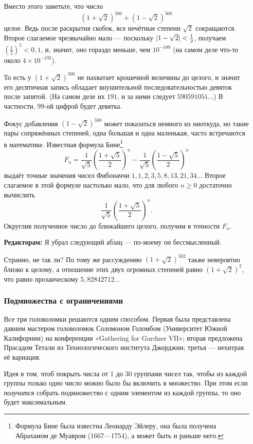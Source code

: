Вместо этого заметьте, что число
\[(1+\sqrt{2})^{500}+(1-\sqrt{2})^{500}\]
целое.
Ведь после раскрытия скобок, все нечётные степени $\sqrt{2}$ сокращаются.
Второе слагаемое чрезвычайно мало --- поскольку $|1-\sqrt{2}|\z<\tfrac12$, получаем $(\tfrac12)^5<0{,}1$, и, значит, оно гораздо меньше, чем $10^{-100}$ (на самом деле что-то около $4 \times 10^{-192}$).

То есть у $(1+\sqrt{2})^{500}$ не нахватает крошечной величины до целого, и значит его десятичная запись обладает внушительной последовательностью девяток после запятой.
(На самом деле их $191$, и за ними следует $590591051\dots$)
В частности, 99-ой цифрой будет девятка.

Фокус добавления $(1-\sqrt{2})^{500}$ может показаться немного из ниоткуда, но такие пары сопряжённых степеней, одна большая и одна маленькая, часто встречаются в математике.
Известная формула Бине\footnote{Формула Бине была известна Леонарду Эйлеру, она была получена Абрахамом де Муавром (1667---1754), а может быть и раньше него.}
\[F_n=\frac{1}{\sqrt{5}}\left(\frac{1+\sqrt{5}}2\right)^n-\frac{1}{\sqrt{5}}\left(\frac{1-\sqrt{5}}2\right)^n\]
выдаёт точные значения чисел Фибоначчи $1, 1, 2, 3, 5, 8, 13, 21, 34 \dots$
Второе слагаемое в этой формуле настолько мало, что для любого $n \ge 0$ достаточно вычислить
\[\frac{1}{\sqrt{5}}\left(\frac{1+\sqrt{5}}2\right)^n.\]
Округлив полученное число до ближайшего целого, получим в точности $F_n$.

\begin{addedbytheeditors}
\textbf{Редакторам:}
Я убрал следующий абзац --- по-моему он бессмысленный.

Странно, не так ли?
По тому же рассуждению $(1+\sqrt{2})^{502}$ также невероятно близко к целому,
а отношение этих двух огромных степеней равно $(1+\sqrt{2})^{2}$, что равно прозаическому  $5{,}82842712\dots$
\end{addedbytheeditors}

\subsubsection*{Подмножества с ограничениями}

Все три головоломки решаются одним способом.
Первая была представлена давним мастером головоломок Соломоном Голомбом (Университет Южной Калифорнии) на конференции
«Ga\-the\-ring for Gard\-ner VII»;
вторая предложена Прасадом Тетали из Технологического института Джорджии;
третья --- нехитрая её вариация.

Идея в том, чтоб покрыть числа от 1 до 30 группами чисел так, чтобы из каждой группы только одно число можно было бы включить в множество.
При этом если \emph{получится} собрать подмножество с одним элементом из каждой группы, то оно будет максимальным.

